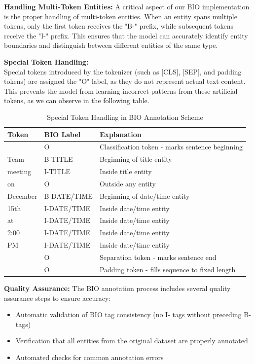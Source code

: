 \documentclass[12pt,a4paper]{article}
\begin{document}
\textbf{Handling Multi-Token Entities:}
A critical aspect of our BIO implementation is the proper handling of multi-token entities. When an entity spans multiple tokens, only the first token receives the "B-" prefix, while subsequent tokens receive the "I-" prefix. This ensures that the model can accurately identify entity boundaries and distinguish between different entities of the same type.

\textbf{Special Token Handling:} \\
Special tokens introduced by the tokenizer (such as [CLS], [SEP], and padding tokens) are assigned the "O" label, as they do not represent actual text content. This prevents the model from learning incorrect patterns from these artificial tokens, as we can observe in the following table.

\begin{table}[H]
\centering
\small
\begin{tabular}{|l|l|l|}
\hline
\textbf{Token} & \textbf{BIO Label} & \textbf{Explanation} \\
\hline
[CLS] & O & Classification token - marks sentence beginning \\
\hline
Team & B-TITLE & Beginning of title entity \\
\hline
meeting & I-TITLE & Inside title entity \\
\hline
on & O & Outside any entity \\
\hline
December & B-DATE/TIME & Beginning of date/time entity \\
\hline
15th & I-DATE/TIME & Inside date/time entity \\
\hline
at & I-DATE/TIME & Inside date/time entity \\
\hline
2:00 & I-DATE/TIME & Inside date/time entity \\
\hline
PM & I-DATE/TIME & Inside date/time entity \\
\hline
[SEP] & O & Separation token - marks sentence end \\
\hline
[PAD] & O & Padding token - fills sequence to fixed length \\
\hline
\end{tabular}
\caption{Special Token Handling in BIO Annotation Scheme}
\end{table}


\textbf{Quality Assurance:}
The BIO annotation process includes several quality assurance steps to ensure accuracy:
\begin{itemize}
    \item Automatic validation of BIO tag consistency (no I- tags without preceding B- tags)
    \item Verification that all entities from the original dataset are properly annotated
    \item Automated checks for common annotation errors
\end{itemize}
\end{document}
